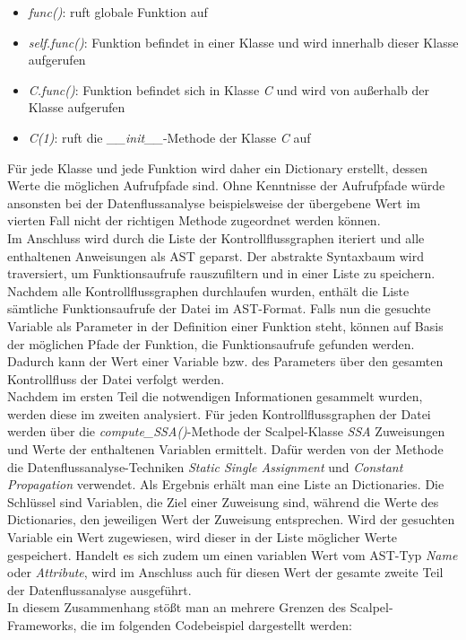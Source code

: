 \documentclass[german,bachelor]{swsLeipzig}
\begin{document}
\begin{itemize}
 \item \textit{func()}: ruft globale Funktion auf
 \item \textit{self.func()}: Funktion befindet in einer Klasse und wird innerhalb dieser Klasse aufgerufen
 \item \textit{C.func()}: Funktion befindet sich in Klasse \textit{C} und wird von außerhalb der Klasse aufgerufen
 \item \textit{C(1)}: ruft die \textit{\_\_init\_\_}-Methode der Klasse \textit{C} auf
\end{itemize}

\noindent Für jede Klasse und jede Funktion wird daher ein Dictionary erstellt, dessen Werte die möglichen Aufrufpfade sind.
Ohne Kenntnisse der Aufrufpfade würde ansonsten bei der Datenflussanalyse beispielsweise der übergebene Wert im vierten Fall
nicht der richtigen Methode zugeordnet werden können.\\
\indent Im Anschluss wird durch die Liste der Kontrollflussgraphen iteriert und alle enthaltenen Anweisungen als AST geparst.
Der abstrakte Syntaxbaum wird traversiert, um Funktionsaufrufe rauszufiltern und in einer Liste zu speichern.
Nachdem alle Kontrollflussgraphen durchlaufen wurden, enthält die Liste sämtliche Funktionsaufrufe der Datei im AST-Format.
Falls nun die gesuchte Variable als Parameter in der Definition einer Funktion steht, können auf Basis der möglichen Pfade
der Funktion, die Funktionsaufrufe gefunden werden.
Dadurch kann der Wert einer Variable bzw. des Parameters über den gesamten Kontrollfluss der Datei verfolgt werden.\\

\noindent Nachdem im ersten Teil die notwendigen Informationen gesammelt wurden, werden diese im zweiten analysiert.
Für jeden Kontrollflussgraphen der Datei werden über die \textit{compute\_SSA()}-Methode der Scalpel-Klasse \textit{SSA} Zuweisungen
und Werte der enthaltenen Variablen ermittelt.
Dafür werden von der Methode die Datenflussanalyse-Techniken \textit{Static Single Assignment} und \textit{Constant Propagation}
verwendet.
Als Ergebnis erhält man eine Liste an Dictionaries.
Die Schlüssel sind Variablen, die Ziel einer Zuweisung sind, während die Werte des Dictionaries, den jeweiligen Wert der Zuweisung
entsprechen.
Wird der gesuchten Variable ein Wert zugewiesen, wird dieser in der Liste möglicher Werte gespeichert.
Handelt es sich zudem um einen variablen Wert vom AST-Typ \textit{Name} oder \textit{Attribute}, wird im Anschluss auch für diesen Wert
der gesamte zweite Teil der Datenflussanalyse ausgeführt.\\
\indent In diesem Zusammenhang stößt man an mehrere Grenzen des Scalpel-Frameworks, die im folgenden Codebeispiel dargestellt werden:\\
\end{document}
